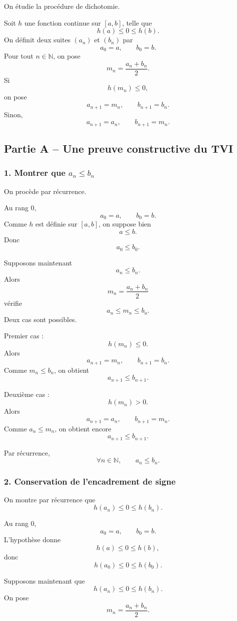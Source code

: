 \documentclass[11pt,a4paper]{article}
\newcommand{\N}{\mathbb{N}}
\begin{document}
On étudie la procédure de dichotomie.

Soit \(h\) une fonction continue sur \([a,b]\), telle que
\[
h(a)\leq0\leq h(b).
\]
On définit deux suites \((a_n)\) et \((b_n)\) par
\[
a_0=a,\qquad b_0=b.
\]
Pour tout \(n\in\N\), on pose
\[
m_n=\frac{a_n+b_n}{2}.
\]
Si
\[
h(m_n)\leq0,
\]
on pose
\[
a_{n+1}=m_n,\qquad b_{n+1}=b_n.
\]
Sinon,
\[
a_{n+1}=a_n,\qquad b_{n+1}=m_n.
\]


\subsection*{Partie A -- Une preuve constructive du TVI}

\subsubsection*{1. Montrer que \(a_n\leq b_n\)}

On procède par récurrence.

Au rang \(0\),
\[
a_0=a,\qquad b_0=b.
\]
Comme \(h\) est définie sur \([a,b]\), on suppose bien
\[
a\leq b.
\]
Donc
\[
a_0\leq b_0.
\]

Supposons maintenant
\[
a_n\leq b_n.
\]
Alors
\[
m_n=\frac{a_n+b_n}{2}
\]
vérifie
\[
a_n\leq m_n\leq b_n.
\]
Deux cas sont possibles.

Premier cas :
\[
h(m_n)\leq0.
\]
Alors
\[
a_{n+1}=m_n,\qquad b_{n+1}=b_n.
\]
Comme \(m_n\leq b_n\), on obtient
\[
a_{n+1}\leq b_{n+1}.
\]

Deuxième cas :
\[
h(m_n)>0.
\]
Alors
\[
a_{n+1}=a_n,\qquad b_{n+1}=m_n.
\]
Comme \(a_n\leq m_n\), on obtient encore
\[
a_{n+1}\leq b_{n+1}.
\]

Par récurrence,
\[
\forall n\in\N,\qquad a_n\leq b_n.
\]


\subsubsection*{2. Conservation de l'encadrement de signe}

On montre par récurrence que
\[
h(a_n)\leq0\leq h(b_n).
\]

Au rang \(0\),
\[
a_0=a,\qquad b_0=b.
\]
L'hypothèse donne
\[
h(a)\leq0\leq h(b),
\]
donc
\[
h(a_0)\leq0\leq h(b_0).
\]

Supposons maintenant que
\[
h(a_n)\leq0\leq h(b_n).
\]
On pose
\[
m_n=\frac{a_n+b_n}{2}.
\]
\end{document}
